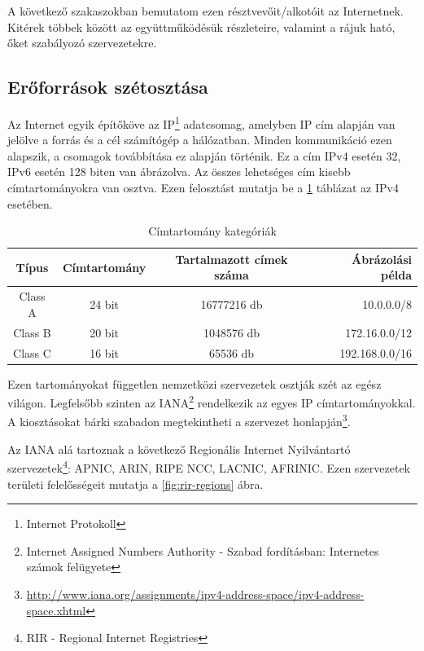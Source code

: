 A következő szakaszokban bemutatom ezen résztvevőit/alkotóit az Internetnek. Kitérek többek között az együttműködésük részleteire, valamint a rájuk ható, őket szabályozó szervezetekre.

\subsection{Erőforrások szétosztása\label{eroforrasok}}
Az Internet egyik építőköve az IP\footnote{Internet Protokoll} adatcsomag, amelyben IP cím alapján van jelölve a forrás és a cél számítógép a hálózatban. Minden kommunikáció ezen alapszik, a csomagok továbbítása ez alapján történik. Ez a cím IPv4 esetén 32, IPv6 esetén 128 biten van ábrázolva. Az összes lehetséges cím kisebb címtartományokra van osztva. Ezen felosztást mutatja be a \ref{tab:cimtartomanyok} táblázat az IPv4 esetében.

\begin{table}[ht]
	\centering
	\caption{Címtartomány kategóriák}
	\hspace{2mm}
	\begin{tabular}{ | c | c | c | r |}
	\hline
	Típus & Címtartomány & Tartalmazott címek száma & Ábrázolási példa \\ \hline

Class A & 24 bit & 16777216 db & 10.0.0.0/8\\ \hline
Class B & 20 bit & 1048576 db & 172.16.0.0/12\\ \hline
Class C & 16 bit & 65536 db & 192.168.0.0/16\\ \hline
	\end{tabular}
	\label{tab:cimtartomanyok}
\end{table}


Ezen tartományokat független nemzetközi szervezetek osztják szét az egész világon. Legfelsőbb szinten az IANA\footnote{Internet Assigned Numbers Authority - Szabad fordításban: Internetes számok felügyete} rendelkezik az egyes IP címtartományokkal. A kiosztásokat bárki szabadon megtekintheti a szervezet honlapján\footnote{\url{http://www.iana.org/assignments/ipv4-address-space/ipv4-address-space.xhtml}}.

Az IANA alá tartoznak a következő Regionális Internet Nyilvántartó szervezetek\footnote{RIR - Regional Internet Registries}: APNIC, ARIN, RIPE NCC, LACNIC, AFRINIC.
Ezen szervezetek területi felelősségeit mutatja a \ref{fig:rir-regions} ábra.

